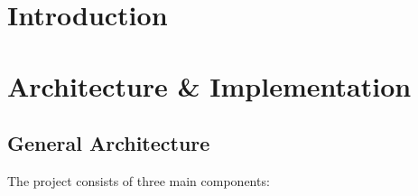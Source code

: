\documentclass[ twoside,openright,titlepage,numbers=noenddot,headinclude,%
                footinclude=true,cleardoublepage=empty,abstractoff, %
                BCOR=5mm,paper=a4,fontsize=11pt,%
                ngerman,american,%
                ]{scrreprt}
\begin{document}
\frenchspacing
\raggedbottom
{} %
\pagestyle{plain}



\pagestyle{scrheadings}
\cleardoublepage
\cleardoublepage{}
\cleardoublepage


\chapter{Introduction}
\label{cha:introduction}


\chapter{Architecture \& Implementation}
\label{cha:arch--impl}

\section{General Architecture}
The project consists of three main components:
\end{document}
